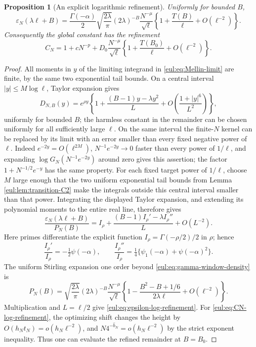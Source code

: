 \documentclass[11pt]{article}
\numberwithin{equation}{section}
\newtheorem{proposition}[theorem]{Proposition}
\theoremstyle{definition}
\theoremstyle{remark}
\begin{document}
\begin{proposition}[An explicit logarithmic refinement]
\label{eul:prop:logarithmic-refinement}
Uniformly for bounded $B$,
\begin{equation}\label{eul:eq:epsilon-log-refinement}
 \varepsilon_N(\lambda\ell+B)
 =\frac{\Gamma(-\alpha)}2\sqrt{\frac{2\lambda}{\pi}}
   (2\lambda)^{-B}\frac{N^{-\mu}}{\sqrt\ell}
   \left\{1+\frac{T(B)}\ell+O(\ell^{-2})\right\}.
\end{equation}
Consequently the global constant has the refinement
\begin{equation}\label{eul:eq:CN-log-refinement}
 C_N=1+cN^{-p}
  +D_0\frac{N^{-\mu}}{\sqrt\ell}
     \left\{1+\frac{T(B_0)}\ell+O(\ell^{-2})\right\}.
\end{equation}
\end{proposition}
\begin{proof}
All moments in $y$ of the limiting integrand in
\eqref{eul:eq:Mellin-limit} are finite, by the same two exponential
tail bounds.  On a central interval $|y|\leq M\log\ell$, Taylor
expansion gives
\[
 D_{N,B}(y)=e^{\rho y}
 \left\{1+\frac{(B-1)y-\lambda y^2}{L}
     +O\!\left(\frac{1+|y|^6}{L^2}\right)\right\},
\]
uniformly for bounded $B$; the harmless constant in the remainder
can be chosen uniformly for all sufficiently large $\ell$.
On the same interval the finite-$N$ kernel can be replaced by its
limit with an error smaller than every fixed negative power of
$\ell$.  Indeed $e^{-2y}=O(\ell^{2M})$,
$N^{-1}e^{-2y}\to0$ faster than every power of $1/\ell$,
and expanding $\log G_N(N^{-1}e^{-2y})$ around zero gives this
assertion; the factor $1+N^{-1/2}e^{-y}$ has the same property.
For each fixed target power of $1/\ell$, choose $M$ large enough
that the two uniform exponential tail bounds from Lemma
\ref{eul:lem:transition-C2} make the integrals outside this central
interval smaller than that power.  Integrating the displayed Taylor
expansion, and extending its polynomial moments to the entire real
line, therefore gives
\[
 \frac{\varepsilon_N(\lambda\ell+B)}{P_N(B)}
 =I_\rho+\frac{(B-1)I_\rho'-\lambda I_\rho''}{L}
       +O(L^{-2}).
\]
Here primes differentiate the explicit function
$I_\rho=\Gamma(-\rho/2)/2$ in $\rho$; hence
\[
 \frac{I_\rho'}{I_\rho}=-\tfrac12\psi(-\alpha),\qquad
 \frac{I_\rho''}{I_\rho}=
       \tfrac14\{\psi_1(-\alpha)+\psi(-\alpha)^2\}.
\]
The uniform Stirling expansion one order beyond
\eqref{eul:eq:gamma-window-density} is
\[
 P_N(B)=\sqrt{\frac{2\lambda}{\pi}}(2\lambda)^{-B}
 \frac{N^{-\mu}}{\sqrt\ell}
 \left\{1-\frac{B^2-B+1/6}{2\lambda\ell}
              +O(\ell^{-2})\right\}.
\]
Multiplication and $L=\ell/2$ give
\eqref{eul:eq:epsilon-log-refinement}.
For \eqref{eul:eq:CN-log-refinement}, the optimizing shift changes
the height by $O(h_Nt_N)=o(h_N\ell^{-2})$, and
$N4^{-\widehat b_N}=o(h_N\ell^{-2})$ by the strict exponent
inequality.  Thus one can evaluate the refined remainder at $B=B_0$.
\end{proof}
\end{document}
